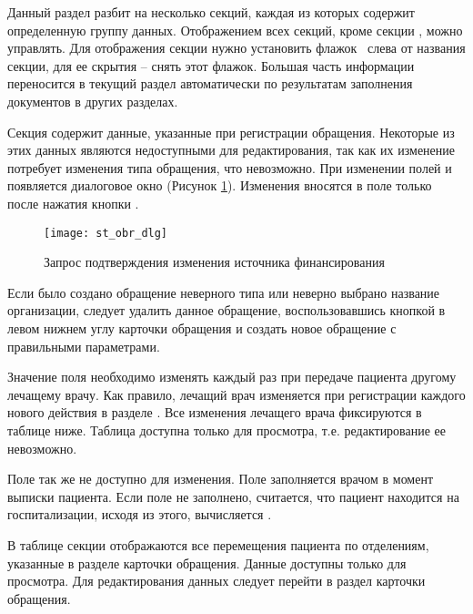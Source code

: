Данный раздел разбит на несколько секций, каждая из которых содержит определенную группу данных. Отображением всех секций, кроме секции , можно управлять. Для отображения секции нужно установить флажок \putx~слева от названия секции, для ее скрытия -- снять этот флажок. Большая часть информации переносится в текущий раздел автоматически по результатам заполнения документов в других разделах.

Секция  содержит данные, указанные при регистрации обращения. Некоторые из этих данных являются недоступными для редактирования, так как их изменение потребует изменения типа обращения, что невозможно. При изменении полей  и  появляется диалоговое окно (Рисунок \ref{img_st_obr_dlg}). Изменения вносятся в поле только после нажатия кнопки .

\begin{figure}[ht]\centering
   \texttt{[image: st\_obr\_dlg]}
   \caption{Запрос подтверждения изменения источника финансирования}
   \label{img_st_obr_dlg}
\end{figure}

\begin{prim}
 Если было создано обращение неверного типа или неверно выбрано название организации, следует удалить данное обращение, воспользовавшись кнопкой  в левом нижнем углу карточки обращения и создать новое обращение с правильными параметрами.
\end{prim} 

Значение поля  необходимо изменять каждый раз при передаче пациента другому лечащему врачу. Как правило, лечащий врач изменяется при регистрации каждого нового действия в разделе . Все изменения лечащего врача фиксируются в таблице ниже. Таблица доступна только для просмотра, т.е. редактирование ее невозможно.

Поле  так же не доступно для изменения. Поле  заполняется врачом в момент выписки пациента. Если поле  не заполнено, считается, что пациент находится на госпитализации, исходя из этого, вычисляется .

В таблице секции  отображаются все перемещения пациента по отделениям, указанные в разделе  карточки обращения. Данные доступны только для просмотра. Для редактирования данных следует перейти в раздел  карточки обращения.

